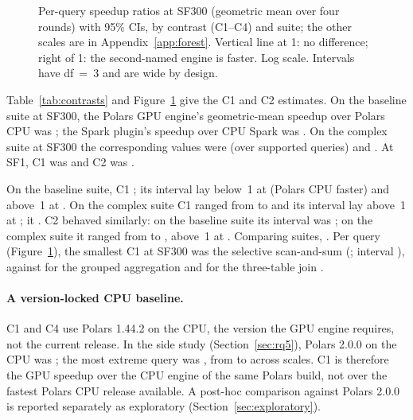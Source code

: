 \documentclass[11pt]{article}
\begin{document}
\begin{figure}[t]
\centering
{}
\caption{Per-query speedup ratios at SF300 (geometric mean over four rounds)
with 95\% CIs, by contrast (C1--C4) and suite; the other scales are in
Appendix~\ref{app:forest}. Vertical line at 1: no difference;
right of 1: the second-named engine is faster. Log scale. Intervals have
df~=~3 and are wide by design. \chartnote}
\label{fig:f1}
\end{figure}

Table~\ref{tab:contrasts} and Figure~\ref{fig:f1} give the C1 and C2 estimates.
On the baseline suite at SF300, the Polars GPU engine's geometric-mean speedup
over Polars CPU was ; the Spark plugin's speedup
over CPU Spark was . On the complex suite at
SF300 the corresponding values were  (over
 supported queries) and
. At SF1, C1 was  and C2
was .

On the baseline suite, C1 ; its interval lay
below~1 at  (Polars CPU faster) and above~1 at
. On the complex suite C1 ranged from
 to  and its interval
lay above~1 at ; it
. C2 behaved similarly: on the baseline suite
its interval was ; on the complex suite it
ranged from
 to , above~1 at
. Comparing suites,
. Per query (Figure~\ref{fig:f1}), the smallest
C1 at SF300 was the selective scan-and-sum 
(; interval
), against
 for the grouped aggregation  and
 for the three-table join .

\paragraph{A version-locked CPU baseline.} C1 and C4 use Polars 1.44.2 on the
CPU, the version the GPU engine requires, not the current release. In the
side study (Section~\ref{sec:rq5}), Polars 2.0.0 on the CPU was
; the most extreme query was
, from
 to
 across scales. C1 is therefore the
GPU speedup over the CPU engine of the same Polars build, not over the
fastest Polars CPU release available. A post-hoc comparison against Polars
2.0.0 is reported separately as exploratory
(Section~\ref{sec:exploratory}).
\end{document}
